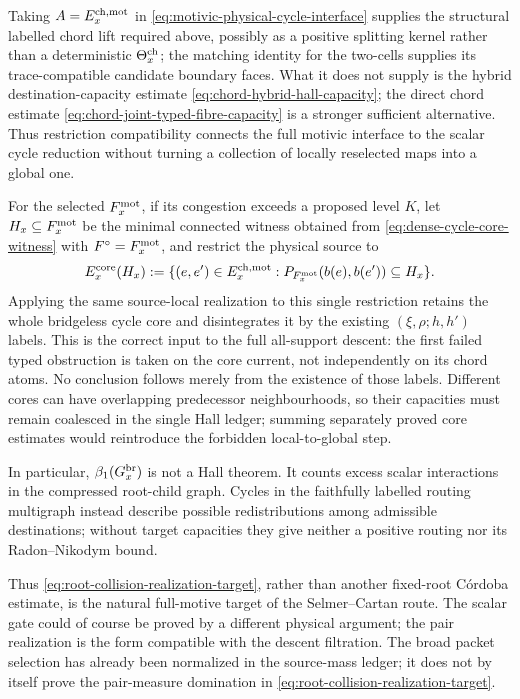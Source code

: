 \documentclass[11pt]{article}
\begin{document}
Taking \(A=E_x^{\rm ch,mot}\) in
\eqref{eq:motivic-physical-cycle-interface} supplies the structural labelled
chord lift required above, possibly as a positive splitting kernel rather than
a deterministic \(\Theta_x^{\rm ch}\); the matching identity for the
two-cells supplies its trace-compatible candidate boundary faces.  What it
does not supply is the hybrid
destination-capacity estimate
\eqref{eq:chord-hybrid-hall-capacity}; the direct chord estimate
\eqref{eq:chord-joint-typed-fibre-capacity} is a stronger sufficient
alternative.  Thus restriction compatibility connects the full motivic
interface to the scalar cycle reduction without turning a collection of
locally reselected maps into a global one.

For the selected \(F_x^{\rm mot}\), if its congestion exceeds a proposed
level \(K\), let \(H_x\subseteq F_x^{\rm mot}\) be the minimal connected
witness obtained from \eqref{eq:dense-cycle-core-witness} with
\(F^\circ=F_x^{\rm mot}\), and restrict the physical source to
\[
 E_x^{\rm core}(H_x)
 :=
 \{(e,e')\in E_x^{\rm ch,mot}:
   P_{F_x^{\rm mot}}(b(e),b(e'))\subseteq H_x\}.
\]
Applying the same source-local realization to this single restriction retains
the whole bridgeless cycle core and disintegrates it by the existing
\((\xi,\rho;h,h')\) labels.  This is the correct input to the full
all-support descent: the first failed typed obstruction is taken on the core
current, not independently on its chord atoms.  No conclusion follows merely
from the existence of those labels.  Different cores can have overlapping
predecessor neighbourhoods, so their capacities must remain coalesced in the
single Hall ledger; summing separately proved core estimates would reintroduce
the forbidden local-to-global step.

In particular, \(\beta_1(G_x^{\rm br})\) is not a Hall theorem.  It counts
excess scalar interactions in the compressed root-child graph.  Cycles in the
faithfully labelled routing multigraph instead describe possible
redistributions among admissible destinations; without target capacities they
give neither a positive routing nor its Radon--Nikodym bound.

Thus
\eqref{eq:root-collision-realization-target}, rather than another fixed-root
C\'ordoba estimate, is the natural full-motive target of the
Selmer--Cartan route.  The scalar gate could of course be proved by a different
physical argument; the pair realization is the form compatible with the
descent filtration.  The broad packet selection has already been normalized in
the source-mass ledger; it does not by itself prove the pair-measure domination
in \eqref{eq:root-collision-realization-target}.
\end{document}
